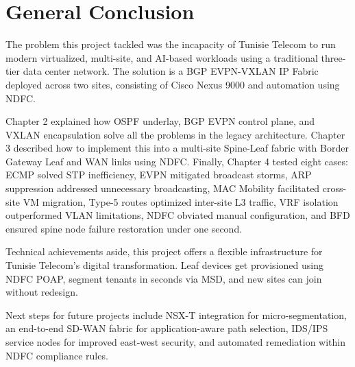 \chapter*{General Conclusion}

\begingroup
\setlength{\parindent}{1.5em}
\setlength{\parskip}{0.8\baselineskip}

\hspace{1.5em}The problem this project tackled was the
incapacity of Tunisie Telecom to run modern virtualized,
multi-site, and AI-based workloads using a traditional
three-tier data center network. The solution is a BGP
EVPN-VXLAN IP Fabric deployed across two sites,
consisting of Cisco Nexus 9000 and automation using
NDFC.

Chapter 2 explained how OSPF underlay, BGP EVPN
control plane, and VXLAN encapsulation solve all the
problems in the legacy architecture. Chapter 3 described
how to implement this into a multi-site Spine-Leaf
fabric with Border Gateway Leaf and WAN links using
NDFC. Finally, Chapter 4 tested eight cases: ECMP solved
STP inefficiency, EVPN mitigated broadcast storms,
ARP suppression addressed unnecessary broadcasting, MAC
Mobility facilitated cross-site VM migration, Type-5
routes optimized inter-site L3 traffic, VRF isolation
outperformed VLAN limitations, NDFC obviated manual
configuration, and BFD ensured spine node failure
restoration under one second.

Technical achievements aside, this project offers a
flexible infrastructure for Tunisie Telecom's digital
transformation. Leaf devices get provisioned using NDFC
POAP, segment tenants in seconds via MSD, and new sites
can join without redesign.

Next steps for future projects include NSX-T
integration for micro-segmentation, an end-to-end
SD-WAN fabric for application-aware path selection,
IDS/IPS service nodes for improved east-west security,
and automated remediation within NDFC compliance rules.
\endgroup